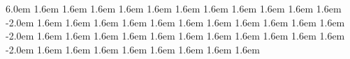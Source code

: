 \hspace6.0em	{
\lower 1.6em	{ 
\lower 1.6em	{
\lower 1.6em	{
\lower 1.6em	{
\lower 1.6em	{ 
\lower 1.6em	{ 
\lower 1.6em	{
\lower 1.6em	{
\lower 1.6em	{ 
\lower 1.6em	{
\lower 1.6em	{
}}}}}}}}}}}}
\hspace-2.0em	{
\lower 1.6em	{
\lower 1.6em	{
\lower 1.6em	{
\lower 1.6em	{ 
\lower 1.6em	{
\lower 1.6em	{
\lower 1.6em	{
\lower 1.6em	{ 
\lower 1.6em	{
\lower 1.6em	{
\lower 1.6em	{  
}}}}}}}}}}}}
\hspace-2.0em	{
\lower 1.6em	{
\lower 1.6em	{
\lower 1.6em	{ 
\lower 1.6em	{
\lower 1.6em	{
\lower 1.6em	{  
\lower 1.6em	{
\lower 1.6em	{
\lower 1.6em	{
\lower 1.6em	{ 
\lower 1.6em	{
}}}}}}}}}}}}
\hspace-2.0em	{
\lower 1.6em	{  
\lower 1.6em	{
\lower 1.6em	{
\lower 1.6em	{
\lower 1.6em	{ 
\lower 1.6em	{
\lower 1.6em	{
\lower 1.6em	{ 
}}}}}}}}}
